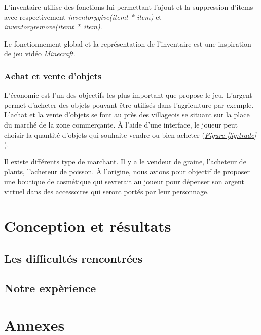 \documentclass{article}
\begin{document}
        L'inventaire utilise des fonctions lui permettant l'ajout et la suppression d'items avec respectivement \textit{inventory\textunderscore give(item\textunderscore t * item)} et \\ \textit{inventory\textunderscore remove(item\textunderscore t *~item)}. 
        
        Le fonctionnement global et la représentation de l'inventaire est une inspiration de jeu vidéo \textit{Minecraft}.
        
        \subsubsection{Achat et vente d'objets}
        L'économie est l'un des objectifs les plus important que propose le jeu. L'argent permet d'acheter des objets pouvant être utilisés dans l'agriculture par exemple. L'achat et la vente d'objets se font au près des villageois se situant sur la place du marché de la zone commerçante. À l'aide d'une interface, le joueur peut choisir la quantité d'objets qui souhaite vendre ou bien acheter (\textit{\hyperref[fig:trade]{Figure \ref{fig:trade}}} ).
        
        Il existe différents type de marchant. Il y a le vendeur de graine, l'acheteur de plants, l'acheteur de poisson. À l'origine, nous avions pour objectif de proposer une boutique de cosmétique qui sevrerait au joueur pour dépenser son argent virtuel dans des accessoires qui seront portés par leur personnage.

        
\section{Conception et résultats}
    \subsection{Les difficultés rencontrées}
    \subsection{Notre expèrience}
\section{Annexes}
\end{document}
